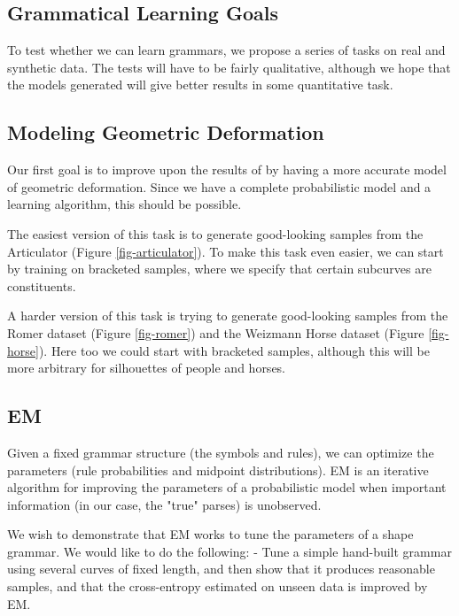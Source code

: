 

\subsection{Grammatical Learning Goals}

To test whether we can learn grammars, we propose a series of tasks on
real and synthetic data. The tests will have to be fairly qualitative,
although we hope that the models generated will give better results in
some quantitative task.

\subsection{Modeling Geometric Deformation}

Our first goal is to improve upon the results of \cite{hcm} by having
a more accurate model of geometric deformation. Since we have a
complete probabilistic model and a learning algorithm, this should be
possible.

The easiest version of this task is to generate good-looking samples
from the Articulator (Figure \ref{fig-articulator}). To make this task
even easier, we can start by training on bracketed samples, where we
specify that certain subcurves are constituents.

A harder version of this task is trying to generate good-looking
samples from the Romer dataset (Figure \ref{fig-romer}) and the
Weizmann Horse dataset (Figure \ref{fig-horse}). Here too we could
start with bracketed samples, although this will be more arbitrary for
silhouettes of people and horses.

\subsection{EM}
Given a fixed grammar structure (the symbols and rules), we can
optimize the parameters (rule probabilities and midpoint
distributions). EM is an iterative algorithm for improving the
parameters of a probabilistic model when important information (in our
case, the "true" parses) is unobserved.

We wish to demonstrate that EM works to tune the parameters of a shape
grammar. We would like to do the following:
  - Tune a simple hand-built grammar using several curves of fixed
    length, and then show that it produces reasonable samples, and
    that the cross-entropy estimated on unseen data is improved by EM.

